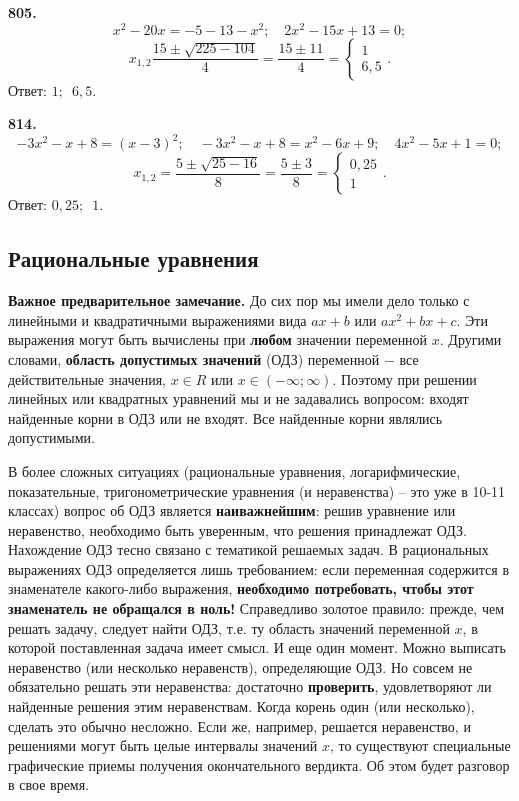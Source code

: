 \textbf{805.} $$x^2-20x=-5-13-x^2;\quad 2x^2-15x+13=0;$$$$ x_{1,2}\frac{15\pm\sqrt{225-104}}{4}=\frac{15\pm11}{4}=\begin{cases}1 \\6,5 \end{cases}.$$ \newline \null \hspace*{\fill} Ответ: $1;\enspace6,5$. 

\textbf{814.} $$-3x^2-x+8=(x-3)^2;\quad -3x^2-x+8=x^2-6x+9;\quad 4x^2-5x+1=0;$$$$ x_{1,2}=\frac{5\pm\sqrt{25-16}}{8}=\frac{5\pm3}{8}=\begin{cases}0,25 \\1 \end{cases}.$$ \newline \null \hspace*{\fill} Ответ: $0,25;\enspace1$. 

\subsection{Рациональные уравнения}


\textbf{Важное предварительное замечание.} До сих пор мы имели дело только с линейными и квадратичными выражениями вида $ax+b$ или $ax^2+bx+c$. Эти выражения могут быть вычислены при \textbf{любом}  значении переменной $x$. Другими словами, \textbf{область допустимых значений} (ОДЗ)  переменной $-$ все действительные значения, $x\in R$ или $x\in (-\infty;\infty)$. Поэтому при решении линейных или квадратных уравнений мы и не задавались вопросом: входят найденные корни в ОДЗ или не входят. Все найденные корни являлись допустимыми.

В более сложных ситуациях (рациональные уравнения, логарифмические, показательные, тригонометрические уравнения (и неравенства) – это уже в 10-11 классах)  вопрос об ОДЗ  является \textbf{наиважнейшим}:  решив уравнение или неравенство, необходимо быть уверенным, что решения принадлежат ОДЗ. 
Нахождение ОДЗ тесно связано с тематикой решаемых задач. В рациональных выражениях ОДЗ определяется лишь требованием: если переменная содержится в знаменателе какого-либо выражения, \textbf{необходимо потребовать, чтобы этот знаменатель не обращался в ноль!} Справедливо золотое правило: прежде, чем решать задачу, следует найти ОДЗ, т.е. ту область значений переменной $x$, в которой поставленная задача имеет смысл.
И еще один момент. Можно выписать неравенство (или несколько неравенств), определяющие ОДЗ. Но совсем не обязательно решать эти неравенства: достаточно \textbf{проверить}, удовлетворяют ли найденные решения этим неравенствам. Когда корень один (или несколько), сделать это обычно несложно. Если же, например, решается неравенство, и решениями могут быть целые интервалы значений $x$, то существуют специальные графические приемы получения окончательного вердикта. Об этом будет разговор в свое время.

